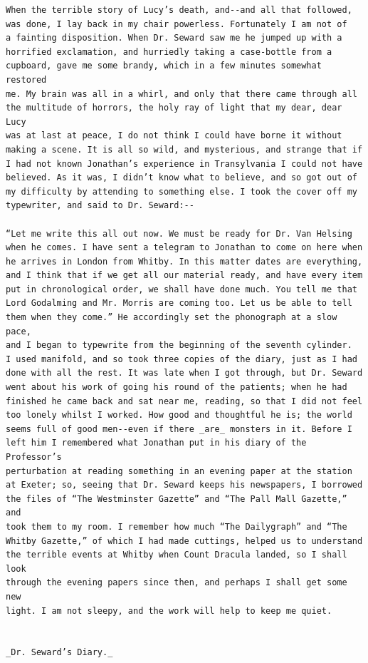 \documentclass{article}
\begin{document}
\begin{verbatim}
When the terrible story of Lucy’s death, and--and all that followed,
was done, I lay back in my chair powerless. Fortunately I am not of
a fainting disposition. When Dr. Seward saw me he jumped up with a
horrified exclamation, and hurriedly taking a case-bottle from a
cupboard, gave me some brandy, which in a few minutes somewhat restored
me. My brain was all in a whirl, and only that there came through all
the multitude of horrors, the holy ray of light that my dear, dear Lucy
was at last at peace, I do not think I could have borne it without
making a scene. It is all so wild, and mysterious, and strange that if
I had not known Jonathan’s experience in Transylvania I could not have
believed. As it was, I didn’t know what to believe, and so got out of
my difficulty by attending to something else. I took the cover off my
typewriter, and said to Dr. Seward:--

“Let me write this all out now. We must be ready for Dr. Van Helsing
when he comes. I have sent a telegram to Jonathan to come on here when
he arrives in London from Whitby. In this matter dates are everything,
and I think that if we get all our material ready, and have every item
put in chronological order, we shall have done much. You tell me that
Lord Godalming and Mr. Morris are coming too. Let us be able to tell
them when they come.” He accordingly set the phonograph at a slow pace,
and I began to typewrite from the beginning of the seventh cylinder.
I used manifold, and so took three copies of the diary, just as I had
done with all the rest. It was late when I got through, but Dr. Seward
went about his work of going his round of the patients; when he had
finished he came back and sat near me, reading, so that I did not feel
too lonely whilst I worked. How good and thoughtful he is; the world
seems full of good men--even if there _are_ monsters in it. Before I
left him I remembered what Jonathan put in his diary of the Professor’s
perturbation at reading something in an evening paper at the station
at Exeter; so, seeing that Dr. Seward keeps his newspapers, I borrowed
the files of “The Westminster Gazette” and “The Pall Mall Gazette,” and
took them to my room. I remember how much “The Dailygraph” and “The
Whitby Gazette,” of which I had made cuttings, helped us to understand
the terrible events at Whitby when Count Dracula landed, so I shall look
through the evening papers since then, and perhaps I shall get some new
light. I am not sleepy, and the work will help to keep me quiet.


_Dr. Seward’s Diary._


\end{verbatim}
\end{document}
